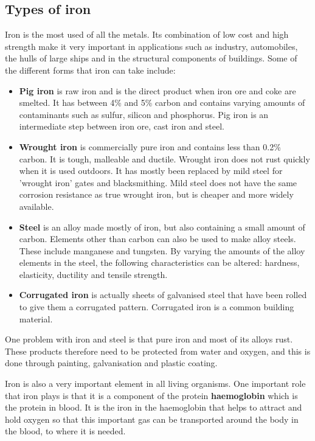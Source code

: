 \subsection{Types of iron}

Iron is the most used of all the metals. Its combination of low cost and high strength make it very important in applications such as industry, automobiles, the hulls of large ships and in the structural components of buildings. Some of the different forms that iron can take include:

\begin{itemize}

\item{\textbf{Pig iron} is raw iron and is the direct product when iron ore and coke are smelted. It has between 4\% and 5\% carbon and contains varying amounts of contaminants such as sulfur, silicon and phosphorus. Pig iron is an intermediate step between iron ore, cast iron and steel.}

\item{\textbf{Wrought iron} is commercially pure iron and contains less than 0.2\% carbon. It is tough, malleable and ductile. Wrought iron does not rust quickly when it is used outdoors. It has mostly been replaced by mild steel for 'wrought iron' gates and blacksmithing. Mild steel does not have the same corrosion resistance as true wrought iron, but is cheaper and more widely available.}

\item{\textbf{Steel} is an alloy made mostly of iron, but also containing a small amount of carbon. Elements other than carbon can also be used to make alloy steels. These include manganese and tungsten. By varying the amounts of the alloy elements in the steel, the following characteristics can be altered: hardness, elasticity, ductility and tensile strength.
}

\item{\textbf{Corrugated iron} is actually sheets of galvanised steel that have been rolled to give them a corrugated pattern. Corrugated iron is a common building material.}
\end{itemize}

One problem with iron and steel is that pure iron and most of its alloys rust. These products therefore need to be protected from water and oxygen, and this is done through painting, galvanisation and plastic coating.

\begin{IFact}{
Iron is also a very important element in all living organisms. One important role that iron plays is that it is a component of the protein \textbf{haemoglobin} which is the protein in blood. It is the iron in the haemoglobin that helps to attract and hold oxygen so that this important gas can be transported around the body in the blood, to where it is needed.
}
\end{IFact}


